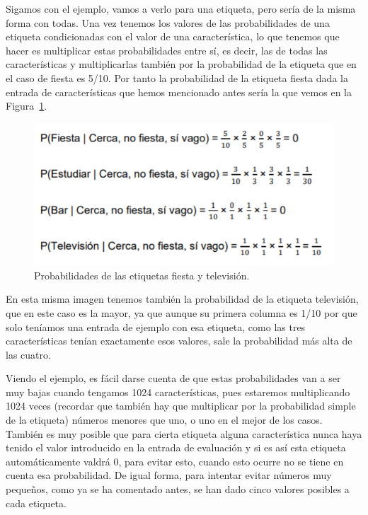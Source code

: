 \documentclass[a4paper, 12pt]{book}
\begin{document}
Sigamos con el ejemplo, vamos a verlo para una etiqueta, pero sería de la misma forma con todas. Una vez tenemos los valores de las probabilidades de una etiqueta condicionadas con el valor de una característica, lo que tenemos que hacer es multiplicar estas probabilidades entre sí, es decir, las de todas las características y multiplicarlas también por la probabilidad de la etiqueta que en el caso de fiesta es 5/10. Por tanto la probabilidad de la etiqueta fiesta dada la entrada de características que hemos mencionado antes sería la que vemos en la Figura~\ref{fig:probabilidadesbayes}. 

\begin{figure}
	\centering
	\includegraphics[width=12cm, keepaspectratio]{img/probabilidadesbayes}
	\caption{Probabilidades de las etiquetas fiesta y televisión.}			
	\label{fig:probabilidadesbayes}
\end{figure}

En esta misma imagen tenemos también la probabilidad de la etiqueta televisión, que en este caso es la mayor, ya que aunque su primera columna es 1/10 por que solo teníamos una entrada de ejemplo con esa etiqueta, como las tres características tenían exactamente esos valores, sale la probabilidad más alta de las cuatro.

Viendo el ejemplo, es fácil darse cuenta de que estas probabilidades van a ser muy bajas cuando tengamos 1024 características, pues estaremos multiplicando 1024 veces (recordar que también hay que multiplicar por la probabilidad simple de la etiqueta) números menores que uno, o uno en el mejor de los casos.
También es muy posible que para cierta etiqueta alguna característica nunca haya tenido el valor introducido en la entrada de evaluación y si es así esta etiqueta automáticamente valdrá 0, para evitar esto, cuando esto ocurre no se tiene en cuenta esa probabilidad. De igual forma, para intentar evitar números muy pequeños, como ya se ha comentado antes, se han dado cinco valores posibles a cada etiqueta.
\end{document}
